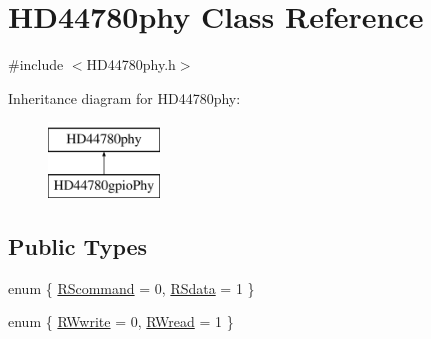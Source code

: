 \hypertarget{class_h_d44780phy}{\section{H\-D44780phy Class Reference}
\label{class_h_d44780phy}
}


{\ttfamily \#include $<$H\-D44780phy.\-h$>$}

Inheritance diagram for H\-D44780phy\-:\begin{figure}[H]
\begin{center}
\leavevmode
\includegraphics[height=2.000000cm]{class_h_d44780phy}
\end{center}
\end{figure}
\subsection*{Public Types}
\begin{DoxyCompactItemize}
\item 
enum \{ \hyperlink{class_h_d44780phy_a76851a61a3a88766704db9f31098d21fac3d8b04a4b6fa7db3d0bfc61170e1d72}{R\-Scommand} = 0, 
\hyperlink{class_h_d44780phy_a76851a61a3a88766704db9f31098d21fa2108dbcf0cc7b6cdcbc6235a4e765654}{R\-Sdata} = 1
 \}
\item 
enum \{ \hyperlink{class_h_d44780phy_a5bf3a330184d4cfdc6297c1265ce6746ac7b87f6864ebbc4bef3d14967ec3bc97}{R\-Wwrite} = 0, 
\hyperlink{class_h_d44780phy_a5bf3a330184d4cfdc6297c1265ce6746a2777116400417dda3d881ec137a361fc}{R\-Wread} = 1
 \}
\end{DoxyCompactItemize}
